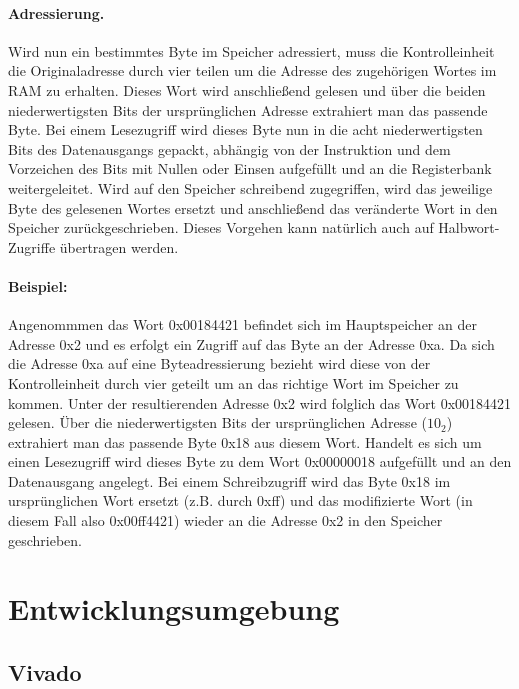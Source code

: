 \paragraph{Adressierung.} Wird nun ein bestimmtes Byte im Speicher adressiert, muss die Kontrolleinheit die Originaladresse durch vier teilen um die Adresse des zugehörigen Wortes im RAM zu erhalten. 
Dieses Wort wird anschließend gelesen und über die beiden niederwertigsten Bits der ursprünglichen Adresse extrahiert man das passende Byte.
Bei einem Lesezugriff wird dieses Byte nun in die acht niederwertigsten Bits des Datenausgangs gepackt, abhängig von der Instruktion und dem Vorzeichen des Bits mit Nullen oder Einsen aufgefüllt und an die Registerbank weitergeleitet.
Wird auf den Speicher schreibend zugegriffen, wird das jeweilige Byte des gelesenen Wortes ersetzt und anschließend das veränderte Wort in den Speicher zurückgeschrieben.
Dieses Vorgehen kann natürlich auch auf Halbwort-Zugriffe übertragen werden.

\paragraph{Beispiel:}
Angenommmen das Wort 0x00184421 befindet sich im Hauptspeicher an der Adresse 0x2 und es erfolgt ein Zugriff auf das Byte an der Adresse 0xa.
Da sich die Adresse 0xa auf eine Byteadressierung bezieht wird diese von der Kontrolleinheit durch vier geteilt um an das richtige Wort im Speicher zu kommen.
Unter der resultierenden Adresse 0x2 wird folglich das Wort 0x00184421 gelesen.
Über die niederwertigsten Bits der ursprünglichen Adresse ($10_2$) extrahiert man das passende Byte 0x18 aus diesem Wort.
Handelt es sich um einen Lesezugriff wird dieses Byte zu dem Wort 0x00000018 aufgefüllt und an den Datenausgang angelegt.
Bei einem Schreibzugriff wird das Byte 0x18 im ursprünglichen Wort ersetzt (z.B. durch 0xff) und das modifizierte Wort (in diesem Fall also 0x00ff4421) wieder an die Adresse 0x2 in den Speicher geschrieben.



\section{Entwicklungsumgebung}
\subsection{Vivado}
